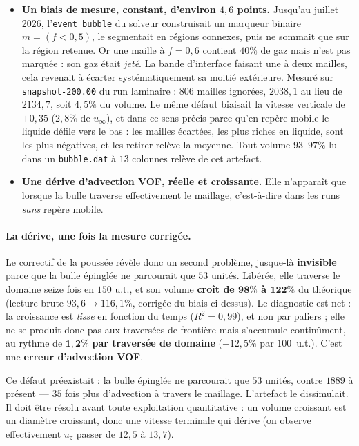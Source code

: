 \begin{itemize}
  \item \textbf{Un biais de mesure, constant, d'environ $4{,}6$ points.} Jusqu'au
   juillet 2026, l'\texttt{event bubble} du solveur construisait un
  marqueur binaire $m=(f<0{,}5)$, le segmentait en régions connexes, puis ne sommait
  que sur la région retenue. Or une maille à $f=0{,}6$ contient $40\%$ de gaz mais
  n'est pas marquée : son gaz était \emph{jeté}. La bande d'interface faisant une à
  deux mailles, cela revenait à écarter systématiquement sa moitié extérieure.
  Mesuré sur \texttt{snapshot-200.00} du run laminaire : $806$ mailles ignorées,
  $2038{,}1$ au lieu de $2134{,}7$, soit $4{,}5\%$ du volume. Le même défaut biaisait
  la vitesse verticale de $+0{,}35$ ($2{,}8\%$ de $u_\infty$), et dans ce sens précis
  parce qu'en repère mobile le liquide défile vers le bas : les mailles écartées,
  les plus riches en liquide, sont les plus négatives, et les retirer relève la
  moyenne. Tout volume \og{}$93$--$97\%$\fg{} lu dans un \texttt{bubble.dat}
  à $13$ colonnes relève de cet artefact.
  \item \textbf{Une dérive d'advection VOF, réelle et croissante.} Elle n'apparaît
  que lorsque la bulle traverse effectivement le maillage, c'est-à-dire dans les runs
  \emph{sans} repère mobile.
\end{itemize}

\paragraph{La dérive, une fois la mesure corrigée.} Le correctif de la poussée
révèle donc un second problème, jusque-là \textbf{invisible} parce que la bulle
épinglée ne parcourait que $53$ unités. Libérée, elle traverse le domaine seize fois
en $150$ u.t., et son volume \textbf{croît de $\mathbf{98\%}$ à $\mathbf{122\%}$}
du théorique (lecture brute $93{,}6\to116{,}1\%$, corrigée du biais ci-dessus).
Le diagnostic est net : la croissance est \emph{lisse} en fonction du temps
($R^2 = 0{,}99$), et non par paliers ; elle ne se produit donc pas aux traversées de
frontière mais s'accumule continûment, au rythme de $\mathbf{1{,}2\%}$
\textbf{par traversée de domaine} ($+12{,}5\%$ par $100$~u.t.). C'est une
\textbf{erreur d'advection VOF}.

Ce défaut préexistait : la bulle épinglée ne parcourait que $53$ unités, contre
$1889$ à présent --- $35$ fois plus d'advection à travers le maillage. L'artefact
le dissimulait. Il doit être résolu avant toute exploitation quantitative : un
volume croissant est un diamètre croissant, donc une vitesse terminale qui dérive
(on observe effectivement $u_z$ passer de $12{,}5$ à $13{,}7$).

